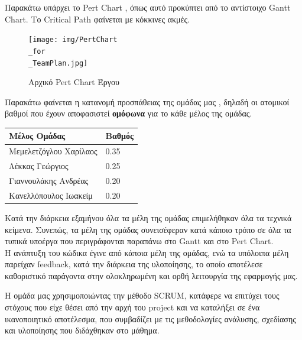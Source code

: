 \documentclass{../ol-softwaremanual}
\begin{document}
	
	\flushleft
	Παρακάτω υπάρχει το \en Pert Chart \gr, όπως αυτό προκύπτει από το αντίστοιχο \en Gantt Chart\gr. Το \en Critical Path \gr φαίνεται με κόκκινες ακμές.
	
	\begin{figure}[htbp!]
		
		\texttt{[image: img/PertChart\\\_for\\\_TeamPlan.jpg]}
		\caption{Αρχικό \en Pert Chart \gr Έργου}
	\end{figure}
	
	\flushleft
	Παρακάτω φαίνεται η κατανομή προσπάθειας της ομάδας μας , δηλαδή οι ατομικοί βαθμοί που έχουν αποφασιστεί \textbf{ομόφωνα} για το κάθε μέλος της ομάδας.
	
	\begin{table}[htbp!]
		\centering
		\begin{tabular}{|l|l|}
			\hline
			\textbf{Μέλος Ομάδας} & \textbf{Βαθμός} \\ \hline
			Μεμελετζόγλου Χαρίλαος &       0.35     \\ \hline
			Λέκκας Γεώργιος		   & 	   0.25		\\ \hline
			Γιαννουλάκης Ανδρέας   &	   0.20		\\ \hline
			Κανελλόπουλος Ιωακείμ  &	   0.20 	\\ \hline
		\end{tabular}
	\end{table}

	\flushleft
	Κατά την διάρκεια εξαμήνου όλα τα μέλη της ομάδας επιμελήθηκαν όλα τα τεχνικά κείμενα. Συνεπώς, τα μέλη της ομάδας συνεισέφεραν κατά κάποιο τρόπο σε όλα τα τυπικά υποέργα που περιγράφονται παραπάνω στο \en Gantt \gr και στο \en Pert Chart\gr. \\
	
	Η ανάπτυξη του κώδικα έγινε από κάποια μέλη της ομάδας, ενώ τα υπόλοιπα μέλη παρείχαν \en feedback\gr, κατά την διάρκεια της υλοποίησης, το οποίο αποτέλεσε καθοριστικό παράγοντα στην ολοκληρωμένη και ορθή λειτουργία της εφαρμογής μας.

	
	
	\flushleft
	Η ομάδα μας χρησιμοποιώντας την μέθοδο \en SCRUM\gr, κατάφερε να επιτύχει τους στόχους που είχε θέσει από την αρχή του \en project \gr και να καταλήξει σε ένα ικανοποιητικό αποτέλεσμα, που συμβαδίζει με τις μεθοδολογίες ανάλυσης, σχεδίασης και υλοποίησης που διδάχθηκαν στο μάθημα. \break
	
\end{document}
